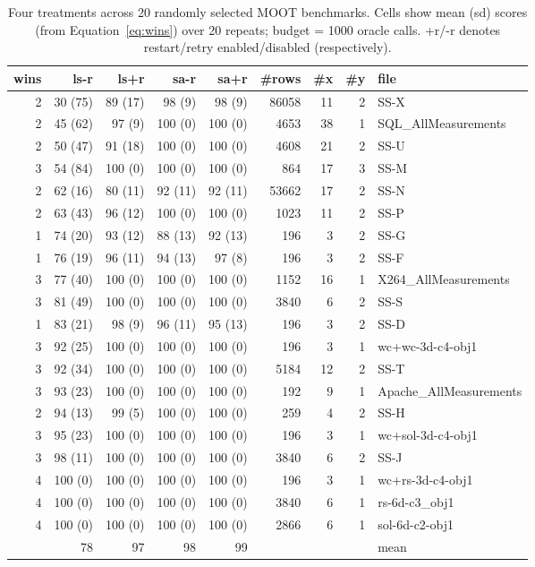 \documentclass[AMA,STIX2COL]{WileyNJDv5}
\begin{document}
\begin{table}[t]
\centering\scriptsize
\caption{Four treatments across 20 randomly selected MOOT benchmarks. Cells show
mean (sd) scores (from Equation~\ref{eq:wins}) over 20 repeats; budget = 1000 oracle calls. +r/-r denotes restart/retry enabled/disabled (respectively).}
\label{tab:opt}
\begin{tabular}{rrrrrrrrl}
wins & ls-r & ls+r & sa-r & sa+r & \#rows & \#x & \#y & file \\
\midrule
2 &  30 (75) &  89 (17) &  98 (9)  &  98 (9)  & 86058 & 11 & 2 & SS-X \\
2 &  45 (62) &  97 (9)  & 100 (0)  & 100 (0)  &  4653 & 38 & 1 & SQL\_AllMeasurements \\
2 &  50 (47) &  91 (18) & 100 (0)  & 100 (0)  &  4608 & 21 & 2 & SS-U \\
3 &  54 (84) & 100 (0)  & 100 (0)  & 100 (0)  &   864 & 17 & 3 & SS-M \\
2 &  62 (16) &  80 (11) &  92 (11) &  92 (11) & 53662 & 17 & 2 & SS-N \\
2 &  63 (43) &  96 (12) & 100 (0)  & 100 (0)  &  1023 & 11 & 2 & SS-P \\
1 &  74 (20) &  93 (12) &  88 (13) &  92 (13) &   196 &  3 & 2 & SS-G \\
1 &  76 (19) &  96 (11) &  94 (13) &  97 (8)  &   196 &  3 & 2 & SS-F \\
3 &  77 (40) & 100 (0)  & 100 (0)  & 100 (0)  &  1152 & 16 & 1 & X264\_AllMeasurements \\
3 &  81 (49) & 100 (0)  & 100 (0)  & 100 (0)  &  3840 &  6 & 2 & SS-S \\
1 &  83 (21) &  98 (9)  &  96 (11) &  95 (13) &   196 &  3 & 2 & SS-D \\
3 &  92 (25) & 100 (0)  & 100 (0)  & 100 (0)  &   196 &  3 & 1 & wc+wc-3d-c4-obj1 \\
3 &  92 (34) & 100 (0)  & 100 (0)  & 100 (0)  &  5184 & 12 & 2 & SS-T \\
3 &  93 (23) & 100 (0)  & 100 (0)  & 100 (0)  &   192 &  9 & 1 & Apache\_AllMeasurements \\
2 &  94 (13) &  99 (5)  & 100 (0)  & 100 (0)  &   259 &  4 & 2 & SS-H \\
3 &  95 (23) & 100 (0)  & 100 (0)  & 100 (0)  &   196 &  3 & 1 & wc+sol-3d-c4-obj1 \\
3 &  98 (11) & 100 (0)  & 100 (0)  & 100 (0)  &  3840 &  6 & 2 & SS-J \\
4 & 100 (0)  & 100 (0)  & 100 (0)  & 100 (0)  &   196 &  3 & 1 & wc+rs-3d-c4-obj1 \\
4 & 100 (0)  & 100 (0)  & 100 (0)  & 100 (0)  &  3840 &  6 & 1 & rs-6d-c3\_obj1 \\
4 & 100 (0)  & 100 (0)  & 100 (0)  & 100 (0)  &  2866 &  6 & 1 & sol-6d-c2-obj1 \\
\midrule
  &  78      &  97      &  98      &  99      &       &    &   & mean 
\end{tabular}
\end{table}
\end{document}
